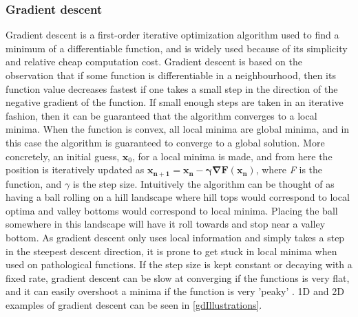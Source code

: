 \subsubsection{Gradient descent}
Gradient descent is a first-order iterative optimization algorithm used to find a minimum of a differentiable function, and is widely used because of its simplicity and relative cheap computation cost. Gradient descent is based on the observation that if some function is differentiable in a neighbourhood, then its function value decreases fastest if one takes a small step in the direction of the negative gradient of the function. If small enough steps are taken in an iterative fashion, then it can be guaranteed that the algorithm converges to a local minima. When the function is convex, all local minima are global minima, and in this case the algorithm is guaranteed to converge to a global solution. More concretely, an initial guess, $\mathbf{x}_0$, for a local minima is made, and from here the position is iteratively updated as $\mathbf{x_{n+1} = \mathbf{x}_n - \gamma\nabla F(\mathbf{x_n})}$, where \textit{F} is the function, and $\gamma$ is the step size. Intuitively the algorithm can be thought of as having a ball rolling on a hill landscape where hill tops would correspond to local optima and valley bottoms would correspond to local minima. Placing the ball somewhere in this landscape will have it roll towards and stop near a valley bottom. As gradient descent only uses local information and simply takes a step in the steepest descent direction, it is prone to get stuck in local minima when used on pathological functions. If the step size is kept constant or decaying with a fixed rate, gradient descent can be slow at converging if the functions is very flat, and it can easily overshoot a minima if the function is very 'peaky' \cite{gradientdescent}. 1D and 2D examples of gradient descent can be seen in \autoref{gdIllustrations}.

